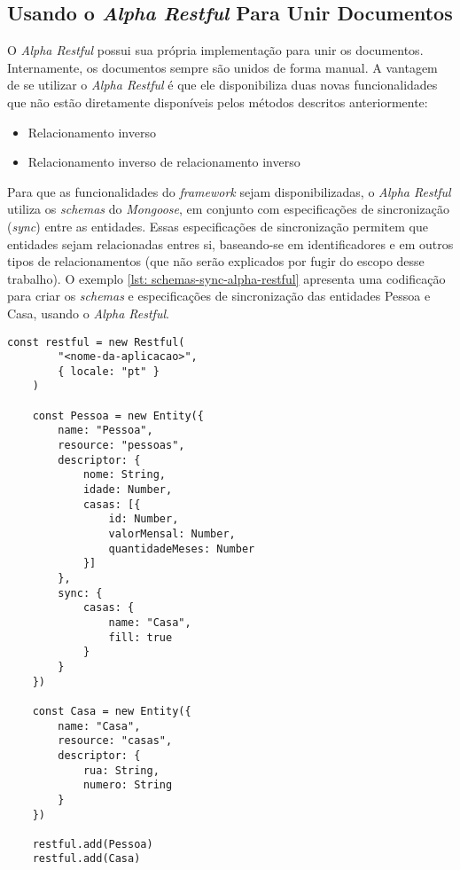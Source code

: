 
\subsection{Usando o \textit{Alpha Restful} Para Unir Documentos}

O \textit{Alpha Restful} possui sua própria implementação para unir os documentos. Internamente, os documentos sempre são unidos de forma manual. A vantagem de se utilizar o \textit{Alpha Restful} é que ele disponibiliza duas novas funcionalidades que não estão diretamente disponíveis pelos métodos descritos anteriormente:

\begin{itemize}
	\item Relacionamento inverso
	\item Relacionamento inverso de relacionamento inverso
\end{itemize}

Para que as funcionalidades do \textit{framework} sejam disponibilizadas, o \textit{Alpha Restful} utiliza os \textit{schemas} do \textit{Mongoose}, em conjunto com especificações de sincronização (\textit{sync}) entre as entidades. Essas especificações de sincronização permitem que entidades sejam relacionadas entres si, baseando-se em identificadores e em outros tipos de relacionamentos (que não serão explicados por fugir do escopo desse trabalho). O exemplo \ref{lst: schemas-sync-alpha-restful} apresenta uma codificação para criar os \textit{schemas} e especificações de sincronização das entidades Pessoa e Casa, usando o \textit{Alpha Restful}.


\begin{lstlisting}[style=ES6, caption={Definição de \textit{Schemas} no \textit{Alpha Restful}\label{lst: schemas-sync-alpha-restful}}]
    const restful = new Restful(
        "<nome-da-aplicacao>",
        { locale: "pt" }
    )

    const Pessoa = new Entity({
        name: "Pessoa",
        resource: "pessoas",
        descriptor: {
            nome: String,
            idade: Number,
            casas: [{
                id: Number,
                valorMensal: Number,
                quantidadeMeses: Number
            }]
        },
        sync: {
            casas: {
                name: "Casa",
                fill: true
            }
        }
    })
    
    const Casa = new Entity({
        name: "Casa",
        resource: "casas",
        descriptor: {
            rua: String,
            numero: String
        }
    })
    
    restful.add(Pessoa)
    restful.add(Casa)
\end{lstlisting}

